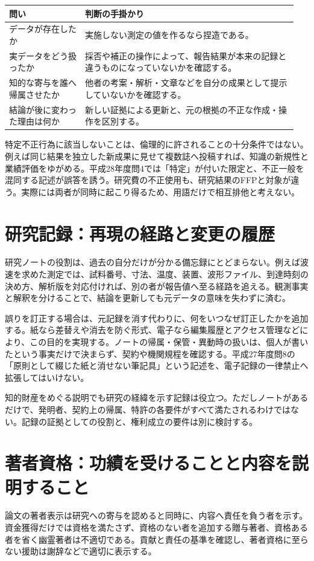 \begin{center}
\begin{tabular}{@{}p{0.25\linewidth}p{0.70\linewidth}@{}}
\toprule
問い & 判断の手掛かり\\
\midrule
データが存在したか & 実施しない測定の値を作るなら捏造である。\\
実データをどう扱ったか & 採否や補正の操作によって、報告結果が本来の記録と違うものになっていないかを確認する。\\
知的な寄与を誰へ帰属させたか & 他者の考案・解析・文章などを自分の成果として提示していないかを確認する。\\
結論が後に変わった理由は何か & 新しい証拠による更新と、元の根拠の不正な作成・操作を区別する。\\
\bottomrule
\end{tabular}
\end{center}

特定不正行為に該当しないことは、倫理的に許されることの十分条件ではない。例えば同じ結果を独立した新成果に見せて複数誌へ投稿すれば、知識の新規性と業績評価をゆがめる。平成28年度問4では「特定」が付いた限定と、不正一般を混同する記述が誤答を誘う。研究費の不正使用も、研究結果のFFPと対象が違う。実際には両者が同時に起こり得るため、用語だけで相互排他と考えない。

\section{研究記録：再現の経路と変更の履歴}
\label{theory:research:records}
研究ノートの役割は、過去の自分だけが分かる備忘録にとどまらない。例えば波速を求めた測定では、試料番号、寸法、温度、装置、波形ファイル、到達時刻の決め方、解析版を対応付ければ、別の者が報告値へ至る経路を追える。観測事実と解釈を分けることで、結論を更新しても元データの意味を失わずに済む。

誤りを訂正する場合は、元記録を消す代わりに、何をいつなぜ訂正したかを追加する。紙なら差替えや消去を防ぐ形式、電子なら編集履歴とアクセス管理などにより、この目的を実現する。ノートの帰属・保管・異動時の扱いは、個人が書いたという事実だけで決まらず、契約や機関規程を確認する\parencite{jsps_integrity2025}。平成27年度問8の「原則として綴じた紙と消せない筆記具」という記述を、電子記録の一律禁止へ拡張してはいけない。

知的財産をめぐる説明でも研究の経緯を示す記録は役立つ。ただしノートがあるだけで、発明者、契約上の帰属、特許の各要件がすべて満たされるわけではない。記録の証拠としての役割と、権利成立の要件は別に検討する。

\section{著者資格：功績を受けることと内容を説明すること}
\label{theory:research:authorship}
論文の著者表示は研究への寄与を認めると同時に、内容へ責任を負う者を示す。資金獲得だけでは資格を満たさず、資格のない者を追加する贈与著者、資格ある者を省く幽霊著者は不適切である。貢献と責任の基準を確認し、著者資格に至らない援助は謝辞などで適切に表示する\parencite{jsps_integrity2025}。


